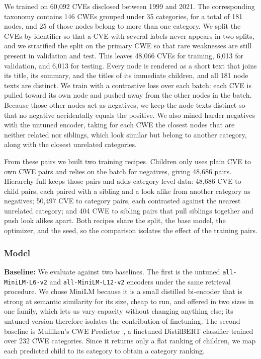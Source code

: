 \documentclass[conference,compsoc]{IEEEtran}
\begin{document}
We trained on 60,092 CVEs disclosed between 1999 and 2021. The corresponding taxonomy contains 146 CWEs grouped under 35 categories, for a total of 181 nodes, and 25 of those nodes belong to more than one category. We split the CVEs by identifier so that a CVE with several labels never appears in two splits, and we stratified the split on the primary CWE so that rare weaknesses are still present in validation and test. This leaves 48,066 CVEs for training, 6,013 for validation, and 6,013 for testing. Every node is rendered as a short text that joins its title, its summary, and the titles of its immediate children, and all 181 node texts are distinct. We train with a contrastive loss over each batch: each CVE is pulled toward its own node and pushed away from the other nodes in the batch. Because those other nodes act as negatives, we keep the node texts distinct so that no negative accidentally equals the positive. We also mined harder negatives with the untuned encoder, taking for each CWE the closest nodes that are neither related nor siblings, which look similar but belong to another category, along with the closest unrelated categories.

From these pairs we built two training recipes. Children only uses plain CVE to own CWE pairs and relies on the batch for negatives, giving 48,686 pairs. Hierarchy full keeps those pairs and adds category level data: 48,686 CVE to child pairs, each paired with a sibling and a look alike from another category as negatives; 50,497 CVE to category pairs, each contrasted against the nearest unrelated category; and 404 CWE to sibling pairs that pull siblings together and push look alikes apart. Both recipes share the split, the base model, the optimizer, and the seed, so the comparison isolates the effect of the training pairs.

\subsubsection{Model}

\textbf{Baseline:} We evaluate against two baselines. The first is the untuned \texttt{all-MiniLM-L6-v2} and \texttt{all-MiniLM-L12-v2} encoders under the same retrieval procedure. We chose MiniLM because it is a small distilled bi-encoder that is strong at semantic similarity for its size, cheap to run, and offered in two sizes in one family, which lets us vary capacity without changing anything else; its untuned version therefore isolates the contribution of finetuning. The second baseline is Mulliken's CWE Predictor~\cite{mullikencwepredictor}, a finetuned DistilBERT classifier trained over 232 CWE categories. Since it returns only a flat ranking of children, we map each predicted child to its category to obtain a category ranking.
\end{document}
